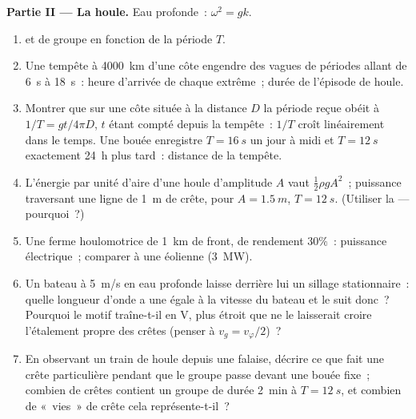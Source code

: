 \begin{problem}
\medskip
\noindent\textbf{Partie II --- La houle.}
Eau profonde~: $\omega^2 = gk$.
\begin{enumerate}[resume]
  \item {} et de groupe en fonction de la période $T$.
  \item Une tempête à \qty{4000}{km} d'une côte engendre des vagues de périodes
        allant de \qty{6}{s} à \qty{18}{s}~: heure d'arrivée de chaque extrême~;
        durée de l'épisode de houle.
  \item Montrer que sur une côte située à la distance $D$ la période reçue obéit à
        $1/T = gt/4\pi D$, $t$ étant compté depuis la tempête~: $1/T$ croît
        linéairement dans le temps. Une bouée enregistre $T = \qty{16}{s}$ un jour à midi
        et $T = \qty{12}{s}$ exactement \qty{24}{h} plus tard~: distance de la
        tempête.
  \item L'énergie par unité d'aire d'une houle d'amplitude $A$ vaut $\tfrac12\rho
        gA^2$~; puissance traversant une ligne de \qty{1}{m} de crête, pour $A =
        \qty{1.5}{m}$, $T = \qty{12}{s}$. (Utiliser la  --- pourquoi~?)
  \item Une ferme houlomotrice de \qty{1}{km} de front, de rendement $30\%$~:
        puissance électrique~; comparer à une éolienne (\qty{3}{MW}).
  \item Un bateau à \qty{5}{m/s} en eau profonde laisse derrière lui un sillage
        stationnaire~: quelle longueur d'onde a une  égale à
        la vitesse du bateau et le suit donc~? Pourquoi le motif traîne-t-il en
        V, plus étroit que ne le laisserait croire l'étalement propre des crêtes
        (penser à $v_g = v_\varphi/2$)~?
  \item En observant un train de houle depuis une falaise, décrire ce que fait une
        crête particulière pendant que le groupe passe devant une
        bouée fixe~; combien de crêtes contient un groupe de durée
        \qty{2}{min} à $T = \qty{12}{s}$, et combien de «~vies~» de crête
        cela représente-t-il~?
\end{enumerate}


\end{problem}

